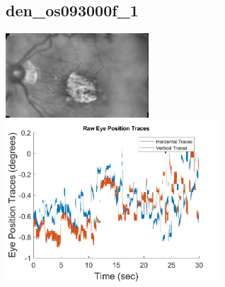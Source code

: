 \documentclass[11pt]{article}
\begin{document}
\subsection{den\_os093000f\_1}
\includegraphics[width=0.40\textwidth, valign=m]{referenceframes/rodenstock_amd/den_os093000f_1_dwt_nostim_gamscaled_bandfilt_refframe.jpg}
\includegraphics[width=0.60\textwidth, valign=m]{eyepositiontraces/rodenstock_amd/den_os093000f_1.jpg}\\
\end{document}
